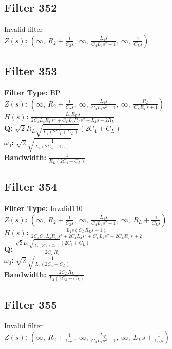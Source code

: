 \documentclass{article}
\begin{document}
\subsection*{Filter 352}
Invalid filter \\ 
\textbf{$Z(s)$:} $\left( \infty, \  R_{2} + \frac{1}{C_{2} s}, \  \infty, \  \frac{L_{4} s}{C_{4} L_{4} s^{2} + 1}, \  \infty, \  \frac{1}{C_{L} s}\right)$ \\ 
\subsection*{Filter 353}
\textbf{Filter Type:} BP \\ 
\textbf{$Z(s)$:} $\left( \infty, \  R_{2} + \frac{1}{C_{2} s}, \  \infty, \  \frac{L_{4} s}{C_{4} L_{4} s^{2} + 1}, \  \infty, \  \frac{R_{L}}{C_{L} R_{L} s + 1}\right)$ \\ 
\textbf{$H(s)$:} $\frac{L_{4} R_{L} s}{2 C_{4} L_{4} R_{L} s^{2} + C_{L} L_{4} R_{L} s^{2} + L_{4} s + 2 R_{L}}$ \\ 
\textbf{Q:} $\sqrt{2} R_{L} \sqrt{\frac{1}{L_{4} \left(2 C_{4} + C_{L}\right)}} \left(2 C_{4} + C_{L}\right)$ \\ 
\textbf{$\omega_0$:} $\sqrt{2} \sqrt{\frac{1}{L_{4} \left(2 C_{4} + C_{L}\right)}}$ \\ 
\textbf{Bandwidth:} $\frac{1}{R_{L} \left(2 C_{4} + C_{L}\right)}$ \\ 
\subsection*{Filter 354}
\textbf{Filter Type:} Invalid110 \\ 
\textbf{$Z(s)$:} $\left( \infty, \  R_{2} + \frac{1}{C_{2} s}, \  \infty, \  \frac{L_{4} s}{C_{4} L_{4} s^{2} + 1}, \  \infty, \  R_{L} + \frac{1}{C_{L} s}\right)$ \\ 
\textbf{$H(s)$:} $\frac{L_{4} s \left(C_{L} R_{L} s + 1\right)}{2 C_{4} C_{L} L_{4} R_{L} s^{3} + 2 C_{4} L_{4} s^{2} + C_{L} L_{4} s^{2} + 2 C_{L} R_{L} s + 2}$ \\ 
\textbf{Q:} $\frac{\sqrt{2} L_{4} \sqrt{\frac{1}{L_{4} \left(2 C_{4} + C_{L}\right)}} \left(2 C_{4} + C_{L}\right)}{2 C_{L} R_{L}}$ \\ 
\textbf{$\omega_0$:} $\sqrt{2} \sqrt{\frac{1}{L_{4} \left(2 C_{4} + C_{L}\right)}}$ \\ 
\textbf{Bandwidth:} $\frac{2 C_{L} R_{L}}{L_{4} \left(2 C_{4} + C_{L}\right)}$ \\ 
\subsection*{Filter 355}
Invalid filter \\ 
\textbf{$Z(s)$:} $\left( \infty, \  R_{2} + \frac{1}{C_{2} s}, \  \infty, \  \frac{L_{4} s}{C_{4} L_{4} s^{2} + 1}, \  \infty, \  L_{L} s + \frac{1}{C_{L} s}\right)$ \\ 
\end{document}
